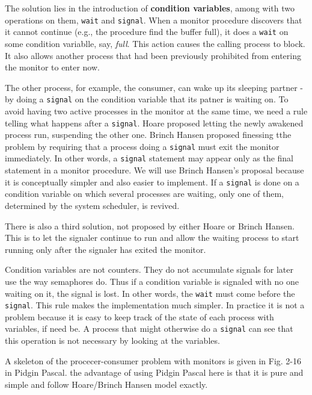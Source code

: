 \documentclass{book}
\newcommand {\kw}  [1] {\textbf{#1}}
\newcommand {\sys} [1] {\textsl{#1}}
\newcommand {\cmd} [1] {\texttt{#1}}
\begin{document}
The solution lies in the introduction of \kw{condition variables}, among with two operations on them, \cmd{wait} and \cmd{signal}.
When a monitor procedure discovers that it cannot continue (e.g., the procedure find the buffer full),
it does a \cmd{wait} on some condition variablle, say, \sys{full}.
This action causes the calling process to block.
It also allows another process that had been previously prohibited from entering the monitor to enter now.

The other process, for example, the consumer, can wake up its sleeping partner - 
by doing a \cmd{signal} on the condition variable that its patner is waiting on.
To avoid having two active processes in the monitor at the same time, we need a rule telling what happens after a \cmd{signal}.
Hoare proposed letting the newly awakened process run, suspending the other one.
Brinch Hansen proposed finessing tthe problem by requiring that a process doing a \cmd{signal} must exit the monitor immediately.
In other words, a \cmd{signal} statement may appear only as the final statement in a monitor procedure.
We will use Brinch Hansen's proposal because it is conceptually simpler and also easier to implement.
If a \cmd{signal} is done on a condition variable on which several processes are waiting, 
only one of them, determined by the system scheduler, is revived.

There is also a third solution, not proposed by either Hoare or Brinch Hansen.
This is to let the signaler continue to run and allow the waiting process to start running only after the signaler has exited the monitor.

Condition variables are not counters.
They do not accumulate signals for later use the way semaphores do.
Thus if a condition variable is signaled with no one waiting on it, the signal is lost.
In other words, the \cmd{wait} must come before the \cmd{signal}.
This rule makes the implementation much simpler.
In practice it is not a problem because it is easy to keep track of the state of each process with variables, if need be.
A process that might otherwise do a \cmd{signal} can see that this operation is not necessary by looking at the variables.

A skeleton of the procecer-consumer problem with monitors is given in Fig. 2-16 in Pidgin Pascal.
the advantage of using Pidgin Pascal here is that it is pure and simple 
and follow Hoare/Brinch Hansen model exactly.
\end{document}
